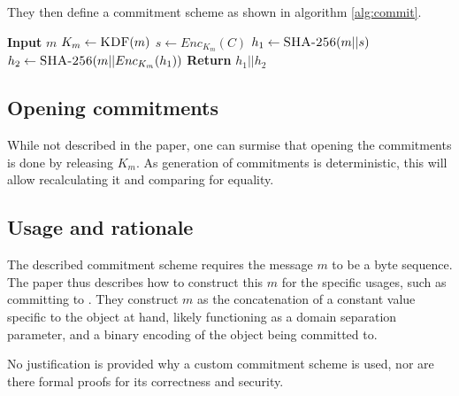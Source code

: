 They then define a commitment scheme as shown in algorithm \ref{alg:commit}.

\begin{algorithm}
	\begin{algorithmic}
		\State \textbf{Input} $m$
		\State $K_m \gets \Call{KDF}{m}$
		\State $s \gets Enc_{K_m}(C)$
		\State $h_1 \gets \Call{SHA-256}{m || s}$
		\State $h_2 \gets \Call{SHA-256}{m || Enc_{K_m}(h_1)}$ 
		\State \textbf{Return} $h_1 || h_2$
	\end{algorithmic}
	\caption{$Commit(m)$}
	\label{alg:commit}
\end{algorithm}

\subsection{Opening commitments}

While not described in the paper, one can surmise that opening the commitments
is done by releasing $K_m$. As generation of commitments is deterministic, this
will allow recalculating it and comparing for equality.

\subsection{Usage and rationale}

The described commitment scheme requires the message $m$ to be a byte sequence.
The paper thus describes how to construct this $m$ for the specific usages,
such as committing to \ptop{}. They construct $m$ as the concatenation of a
constant value specific to the object at hand, likely functioning as a domain
separation parameter, and a binary encoding of the object being committed to.

No justification is provided why a custom commitment scheme is used, nor are
there formal proofs for its correctness and security.
